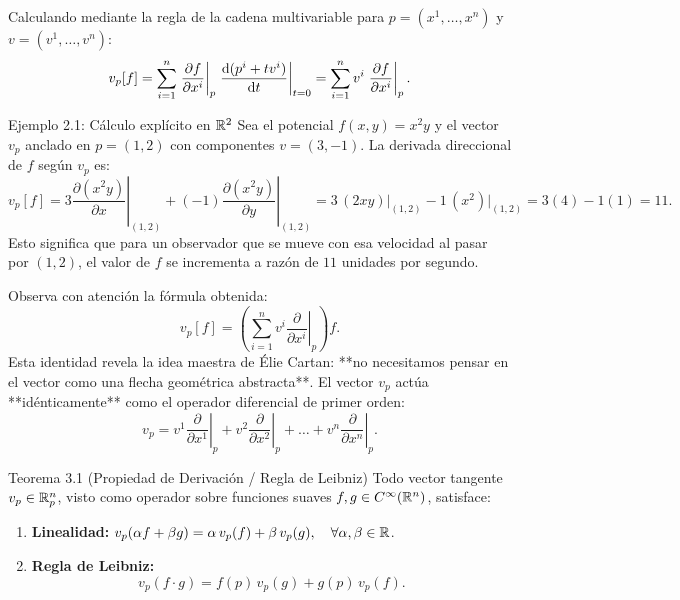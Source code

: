 \documentclass[11pt,letterpaper]{article}
\begin{document}
Calculando mediante la regla de la cadena multivariable para $p = (x^1, \dots, x^n)$ y $v = (v^1, \dots, v^n)$:
\[
v_p[f] = \sum_{i=1}^n \left. \frac{\partial f}{\partial x^i} \right|_p \left. \frac{\mathrm{d} (p^i + t v^i)}{\mathrm{d} t} \right|_{t=0} = \sum_{i=1}^n v^i \left. \frac{\partial f}{\partial x^i} \right|_p.
\]

\begin{examplebox}{Ejemplo 2.1: Cálculo explícito en $\mathbb{R}^2$}
Sea el potencial $f(x, y) = x^2 y$ y el vector $v_p$ anclado en $p = (1, 2)$ con componentes $v = (3, -1)$.
La derivada direccional de $f$ según $v_p$ es:
\[
v_p[f] = 3 \left.\frac{\partial (x^2 y)}{\partial x}\right|_{(1,2)} + (-1) \left.\frac{\partial (x^2 y)}{\partial y}\right|_{(1,2)} = 3\,(2xy)\Big|_{(1,2)} - 1\,(x^2)\Big|_{(1,2)} = 3(4) - 1(1) = 11.
\]
Esto significa que para un observador que se mueve con esa velocidad al pasar por $(1,2)$, el valor de $f$ se incrementa a razón de $11$ unidades por segundo.
\end{examplebox}


Observa con atención la fórmula obtenida:
\[
v_p[f] = \left( \sum_{i=1}^n v^i \left.\frac{\partial}{\partial x^i}\right|_p \right) f.
\]
Esta identidad revela la idea maestra de Élie Cartan: **no necesitamos pensar en el vector como una flecha geométrica abstracta**. El vector $v_p$ actúa **idénticamente** como el operador diferencial de primer orden:
\[
v_p = v^1 \left.\frac{\partial}{\partial x^1}\right|_p + v^2 \left.\frac{\partial}{\partial x^2}\right|_p + \dots + v^n \left.\frac{\partial}{\partial x^n}\right|_p.
\]

\begin{theorembox}{Teorema 3.1 (Propiedad de Derivación / Regla de Leibniz)}
Todo vector tangente $v_p \in \mathbb{R}^n_p$, visto como operador sobre funciones suaves $f, g \in C^\infty(\mathbb{R}^n)$, satisface:
\begin{enumerate}
    \item \textbf{Linealidad:} $v_p(\alpha f + \beta g) = \alpha\, v_p(f) + \beta\, v_p(g), \quad \forall \alpha, \beta \in \mathbb{R}$.
    \item \textbf{Regla de Leibniz:}
    \[
    v_p(f \cdot g) = f(p)\, v_p(g) + g(p)\, v_p(f).
    \]
\end{enumerate}
\end{theorembox}
\end{document}
